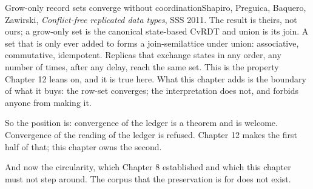 \begin{Theorem}{Grow-only record sets converge without coordination}{Shapiro, Preguica, Baquero, Zawirski, \emph{Conflict-free replicated data types}, SSS 2011. The result is theirs, not ours; a grow-only set is the canonical state-based CvRDT and union is its join.}
A set that is only ever added to forms a join-semilattice under union: associative, commutative, idempotent. Replicas that exchange states in any order, any number of times, after any delay, reach the same set. This is the property Chapter 12 leans on, and it is true here. What this chapter adds is the boundary of what it buys: the row-set converges; the interpretation does not, and  forbids anyone from making it.
\end{Theorem}

So the position is: convergence of the ledger is a theorem and is welcome. Convergence of the reading of the ledger is refused. Chapter 12 makes the first half of that; this chapter owns the second.

And now the circularity, which Chapter 8 established and which this chapter must not step around. The corpus that the preservation is for does not exist.

